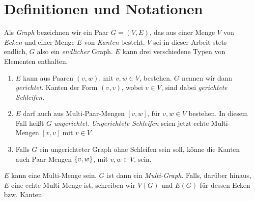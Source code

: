 \section{Definitionen und Notationen}

\begin{definition}

    Als \textit{Graph} bezeichnen wir ein Paar $G = (V, E)$, das aus einer Menge $V$ von \textit{Ecken} und einer Menge $E$ von \textit{Kanten} besteht.
    $V$ sei in dieser Arbeit stets endlich, $G$ also ein \textit{endlicher} Graph.
    $E$ kann drei verschiedene Typen von Elementen enthalten.

    \begin{enumerate}

        \item $E$ kann aus Paaren $(v, w)$, mit $v, w \in V$, bestehen.
        $G$ nennen wir dann \textit{gerichtet}.
        Kanten der Form $(v, v)$, wobei $v \in V$, sind dabei \textit{gerichtete Schleifen}.

        \item $E$ darf auch aus Multi-Paar-Mengen $[v, w]$, für $v, w \in V$ bestehen.
        In diesem Fall heißt $G$ \textit{ungerichtet}.
        \textit{Ungerichtete Schleifen} seien jetzt echte Multi-Mengen $[v, v]$ mit $v \in V$.

        \item Falls $G$ ein ungerichteter Graph ohne Schleifen sein soll, könne die Kanten auch Paar-Mengen ${\left \{ v, w \right \}}$, mit $v, w \in V$, sein.

    \end{enumerate}

    $E$ kann eine Multi-Menge sein.
    $G$ ist dann ein \textit{Multi-Graph}.
    Falls, darüber hinaus, $E$ eine echte Multi-Menge ist, schreiben wir $V(G)$ und $E(G)$ für dessen Ecken bzw. Kanten.

\end{definition}

